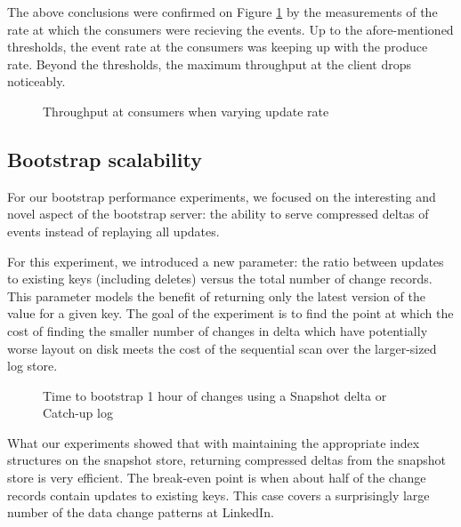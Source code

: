 The above conclusions were confirmed on Figure \ref{fig:throughput-poll10} by the measurements of the rate at which the consumers were recieving the events. Up to the afore-mentioned thresholds, the event rate at the consumers was keeping up with the produce rate. Beyond the thresholds, the maximum throughput at the client drops noticeably.


\begin{figure}
\centering
{}
\caption{Throughput at consumers when varying update rate}
\label{fig:throughput-poll10}
\end{figure}


\subsection{Bootstrap scalability}

For our bootstrap performance experiments, we focused on the interesting and novel aspect of the bootstrap server: the ability to serve compressed deltas of events instead of replaying all updates. 

For this experiment, we introduced a new parameter: the ratio between updates to existing keys (including deletes) versus the total number of change records. This parameter models the benefit of returning only the latest version of the value for a given key. The goal of the experiment is to find the point at which the cost of finding the smaller number of changes in delta which have potentially worse layout on disk meets the cost of the sequential scan over the larger-sized log store. 

\begin{figure}
\centering
{}
\caption{Time to bootstrap 1 hour of changes using a Snapshot delta or Catch-up log}
\label{fig:snapshot_vs_catchup}
\end{figure}

What our experiments showed that with maintaining the appropriate index structures on the snapshot store, returning compressed deltas from the snapshot store is very efficient. The break-even point is when about half of the change records contain updates to existing keys. This case covers a surprisingly large number of the data change patterns at LinkedIn. 


